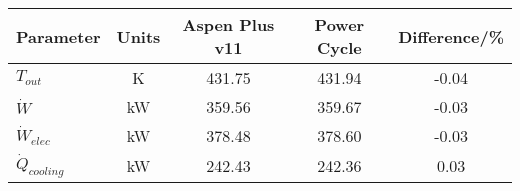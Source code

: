 \begin{tabular}{|p{2.5cm} c c c c|}
    \hline
    \rowcolor{bluepoli!40} %
    \textbf{Parameter} & \textbf{Units} & \textbf{Aspen Plus v11} & \textbf{Power Cycle} & \textbf{Difference/\unit{\percent}} \T\B \\
    \hline \hline
    \(T_{out}\) & \unit{\K} & 431.75 & 431.94 & -0.04 \T\B\\
    \(\Dot{W}\) & \unit{\kilo\watt} & 359.56 & 359.67 & -0.03 \T\B\\
    \(\Dot{W}_{elec}\) & \unit{\kilo\watt} & 378.48 & 378.60 & -0.03 \T\B\\
    \(\Dot{Q}_{cooling}\) & \unit{\kilo\watt} & 242.43 & 242.36 & 0.03 \T\B\\
    \hline
\end{tabular}